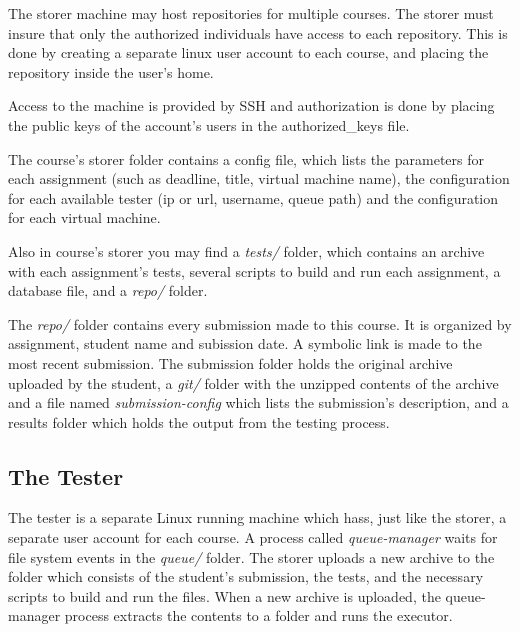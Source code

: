\begin{center}
\end{center}

The storer machine may host repositories for multiple courses. The storer
must insure that only the authorized individuals have access to each repository.
This is done by creating a separate linux user account to each course, and placing
the repository inside the user's home. 

Access to the machine is provided by SSH and authorization is done by placing
the public keys of the account's users in the authorized_keys file.

The course's storer folder contains a config file, which lists the parameters
for each assignment (such as deadline, title, virtual machine name), the 
configuration for each available tester (ip or url, username, queue path)
and the configuration for each virtual machine.

Also in course's storer you may find a \textit{tests/} folder, which contains an archive
with each assignment's tests, several scripts to build and run each assignment,
a database file, and a \textit{repo/} folder.

\begin{center}
\end{center}

The \textit{repo/} folder contains every submission made to this course. It is organized
by assignment, student name and subission date. A symbolic link is made to the 
most recent submission. The submission folder holds the original archive uploaded
by the student, a \textit{git/} folder with the unzipped contents of the archive and a 
file named \textit{submission-config} which lists the submission's description, and a
results folder which holds the output from the testing process.

\subsection{The Tester}
\label{sub-sec:tester}

The tester is a separate Linux running machine which hass, just like the storer,
a separate user account for each course. A process called \textit{queue-manager}
waits for file system events in the \textit{queue/} folder. The storer uploads a new
archive to the folder which consists of the student's submission, the tests, and
the necessary scripts to build and run the files. When a new archive is uploaded,
the queue-manager process extracts the contents to a folder and runs the executor.

